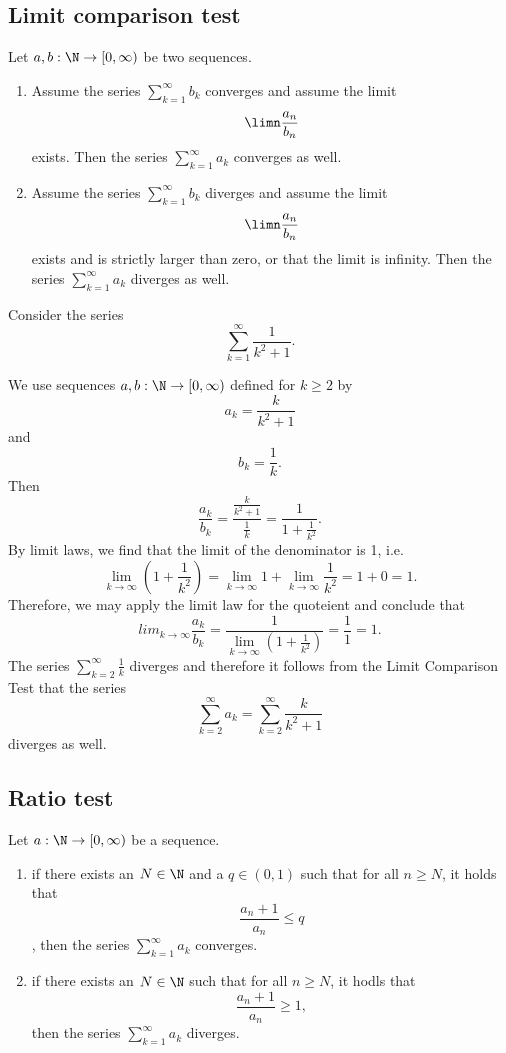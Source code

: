 \subsection{Limit comparison test}
\begin{theorem}
    Let $a,b: \N \to [0, \infty)$ be two sequences.
    \begin{enumerate}
        \item Assume the series $\sum_{k=1}^\infty b_k$ converges and assume the limit
            $$\limn \frac{a_n}{b_n}$$
            exists. Then the series $\sum_{k=1}^\infty a_k$ converges as well.
        \item Assume the series $\sum_{k=1}^\infty b_k$ diverges and assume the limit
            $$\limn \frac{a_n}{b_n}$$
            exists and is strictly larger than zero, or that the limit is infinity. Then the series $\sum_{k=1}^\infty a_k$ diverges as well.
    \end{enumerate}
\end{theorem}
\begin{example}
    Consider the series
    $$\sum_{k=1}^{\infty}\frac{1}{k^2+1}.$$

    We use sequences $a,b: \N \to [0, \infty)$ defined for $k \ge 2$ by
    $$a_k = \frac{k}{k^2+1}$$ and
    $$b_k = \frac{1}{k}.$$
    Then
    $$\frac{a_k}{b_k} = \frac{\frac{k }{k^2 + 1}}{\frac{1}{k }} = \frac{1}{1+\frac{1}{k^2}}.$$
    By limit laws, we find that the limit of the denominator is 1, i.e.
    $$\lim_{k\to\infty} \left(1 + \frac{1}{k^2}\right) = \lim_{k\to\infty} 1 + \lim_{k\to\infty} \frac{1}{k^2} = 1 + 0 = 1.$$
    Therefore, we may apply the limit law for the quoteient and conclude that
    $$lim_{k\to\infty}\frac{a_k}{b_k} = \frac{1}{\lim_{k\to\infty}\left(1+\frac{1}{k^2}\right)} = \frac{1}{1} = 1.$$
    The series $\displaystyle\sum_{k=2 }^{\infty}\frac{1}{k}$ diverges and therefore it follows from the Limit Comparison Test that the series
    $$\sum_{k=2 }^{\infty}a_k = \sum_{k=2 }^{\infty}\frac{k}{k^2+1}$$
    diverges as well.
\end{example}

\subsection{Ratio test}
\begin{theorem}
    Let $a: \N \to [0, \infty)$ be a sequence.
    \begin{enumerate}
        \item if there exists an $N \in \N$ and a $q \in (0,1)$ such that for all $n \ge N$, it holds that
            $$\frac{a_n+1}{a_n} \le q$$,
            then the series $\sum_{k=1}^\infty a_k$ converges.
        \item if there exists an $N \in \N$ such that for all $n \ge N$, it hodls that
            $$\frac{a_n+1}{a_n} \ge 1,$$
            then the series $\sum_{k=1}^\infty a_k$ diverges.
    \end{enumerate}
\end{theorem}

